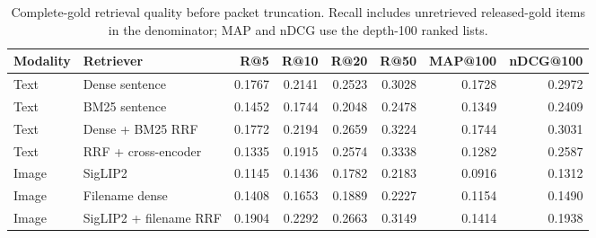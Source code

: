 \begin{table}[t]
\centering
\caption{Complete-gold retrieval quality before packet truncation. Recall includes unretrieved released-gold items in the denominator; MAP and nDCG use the depth-100 ranked lists.}
\label{tab:retrieval-matrix}
\small
\setlength{\tabcolsep}{5pt}
\begin{tabular}{llrrrrrr}
\toprule
Modality & Retriever & R@5 & R@10 & R@20 & R@50 & MAP@100 & nDCG@100 \\
\midrule
Text & Dense sentence & 0.1767 & 0.2141 & 0.2523 & 0.3028 & 0.1728 & 0.2972 \\
Text & BM25 sentence & 0.1452 & 0.1744 & 0.2048 & 0.2478 & 0.1349 & 0.2409 \\
Text & Dense + BM25 RRF & 0.1772 & 0.2194 & 0.2659 & 0.3224 & 0.1744 & 0.3031 \\
Text & RRF + cross-encoder & 0.1335 & 0.1915 & 0.2574 & 0.3338 & 0.1282 & 0.2587 \\
Image & SigLIP2 & 0.1145 & 0.1436 & 0.1782 & 0.2183 & 0.0916 & 0.1312 \\
Image & Filename dense & 0.1408 & 0.1653 & 0.1889 & 0.2227 & 0.1154 & 0.1490 \\
Image & SigLIP2 + filename RRF & 0.1904 & 0.2292 & 0.2663 & 0.3149 & 0.1414 & 0.1938 \\
\bottomrule
\end{tabular}
\end{table}
